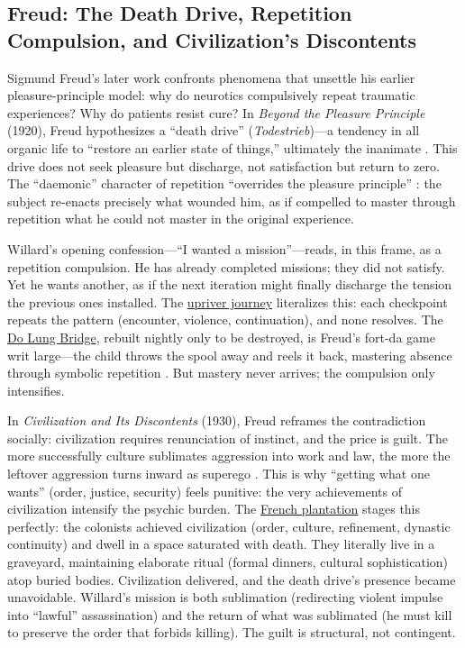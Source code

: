\subsection*{Freud: The Death Drive, Repetition Compulsion, and Civilization's Discontents}
\label{ssec:vi-freud}

Sigmund Freud's later work confronts phenomena that unsettle his earlier pleasure-principle
model: why do neurotics compulsively repeat traumatic experiences? Why do patients resist cure?
In \textit{Beyond the Pleasure Principle} (1920), Freud hypothesizes a ``death drive''
(\emph{Todestrieb})---a tendency in all organic life to ``restore an earlier state of things,''
ultimately the inanimate \parencite[p.~38]{FreudBeyond1955}. This drive does not seek pleasure
but discharge, not satisfaction but return to zero. The ``daemonic'' character of repetition
``overrides the pleasure principle'' \parencite[p.~22]{FreudBeyond1955}: the subject
re-enacts precisely what wounded him, as if compelled to master through repetition what he
could not master in the original experience.

Willard's opening confession---``I wanted a mission''---reads, in this frame, as a repetition
compulsion. He has already completed missions; they did not satisfy. Yet he wants another, as
if the next iteration might finally discharge the tension the previous ones installed. The
\hyperref[scene:upriver-journey]{upriver journey} literalizes this: each checkpoint repeats
the pattern (encounter, violence, continuation), and none resolves. The
\hyperref[scene:do-lung-bridge]{Do Lung Bridge}, rebuilt nightly only to be destroyed, is
Freud's fort-da game writ large---the child throws the spool away and reels it back,
mastering
absence through symbolic repetition \parencite[pp.~14--16]{FreudBeyond1955}. But mastery never
arrives; the compulsion only intensifies.

In \textit{Civilization and Its Discontents} (1930), Freud reframes the contradiction
socially: civilization requires renunciation of instinct, and the price is guilt. The more
successfully culture sublimates aggression into work and law, the more the leftover aggression
turns inward as superego \parencite[pp.~70--97]{FreudCivilization1961}. This is why ``getting
what one wants'' (order, justice, security) feels punitive: the very achievements of
civilization intensify the psychic burden. The
\hyperref[scene:french-plantation]{French plantation} stages this perfectly: the colonists
achieved civilization (order, culture, refinement, dynastic continuity) and dwell in a space
saturated with death. They literally live in a graveyard, maintaining elaborate ritual
(formal dinners, cultural sophistication) atop buried bodies. Civilization delivered, and the
death drive's presence became unavoidable. Willard's mission is both sublimation (redirecting
violent impulse into ``lawful'' assassination) and the return of what was sublimated (he must
kill to preserve the order that forbids killing). The guilt is structural, not contingent.

